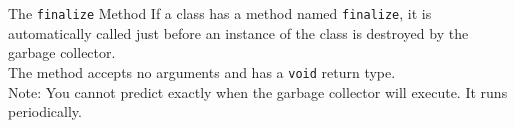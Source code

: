 \documentclass[11pt]{beamer}
\begin{document}
\begin{frame}{The \texttt{finalize} Method}
    If a class has a method named \texttt{finalize}, it is automatically called just before an instance of the class is destroyed by the garbage collector. \\ \vspace{1em}
    The method accepts no arguments and has a \texttt{void} return type. \\ \vspace{1em}
    Note: You cannot predict exactly when the garbage collector will execute. It runs periodically.
\end{frame}
\end{document}
